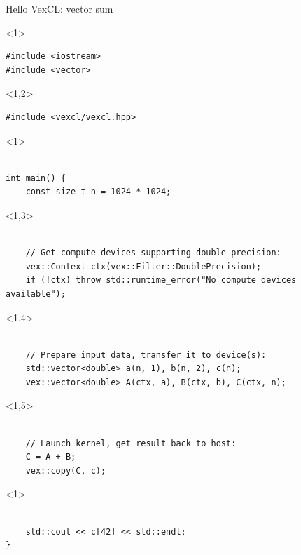 \documentclass[@BEAMER_OPTIONS@]{beamer}
\begin{document}
\begin{frame}[fragile,shrink=5]{Hello VexCL: vector sum}
    \begin{exampleblock}{}
        \begin{uncoverenv}<1>
            \begin{lstlisting}
#include <iostream>
#include <vector>
            \end{lstlisting}
        \end{uncoverenv}
        \begin{uncoverenv}<1,2>
            \begin{lstlisting}[firstnumber=last]
#include <vexcl/vexcl.hpp>
            \end{lstlisting}
        \end{uncoverenv}
        \begin{uncoverenv}<1>
            \begin{lstlisting}[firstnumber=last]

int main() {
    const size_t n = 1024 * 1024;
            \end{lstlisting}
        \end{uncoverenv}
        \begin{uncoverenv}<1,3>
            \begin{lstlisting}[firstnumber=last]

    // Get compute devices supporting double precision:
    vex::Context ctx(vex::Filter::DoublePrecision);
    if (!ctx) throw std::runtime_error("No compute devices available");
            \end{lstlisting}
        \end{uncoverenv}
        \begin{uncoverenv}<1,4>
            \begin{lstlisting}[firstnumber=last]

    // Prepare input data, transfer it to device(s):
    std::vector<double> a(n, 1), b(n, 2), c(n);
    vex::vector<double> A(ctx, a), B(ctx, b), C(ctx, n);
            \end{lstlisting}
        \end{uncoverenv}
        \begin{uncoverenv}<1,5>
            \begin{lstlisting}[firstnumber=last]

    // Launch kernel, get result back to host:
    C = A + B;
    vex::copy(C, c);
            \end{lstlisting}
        \end{uncoverenv}
        \begin{uncoverenv}<1>
            \begin{lstlisting}[firstnumber=last]

    std::cout << c[42] << std::endl;
}
            \end{lstlisting}
        \end{uncoverenv}
    \end{exampleblock}
\end{frame}
\end{document}
